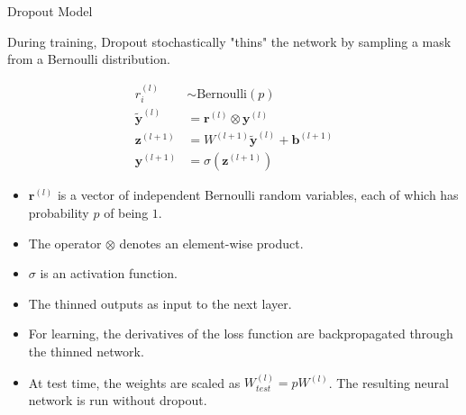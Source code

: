 \documentclass[aspectratio=169,xcolor=dvipsnames,svgnames,x11names,fleqn]{beamer}
\begin{document}
\begin{frame}{Dropout Model}

    \footnotesize

During training, Dropout stochastically "thins" the network by sampling a mask from a Bernoulli distribution.

    \begin{mybox}{}
        \begin{align*}
        r_i^{(l)} &\sim \text{Bernoulli}(p) \tag{Mask} \\
        \mathbf{\tilde{y}}^{(l)} &= \mathbf{r}^{(l)} \otimes \mathbf{y}^{(l)} \tag{Thinned Output} \\
        \mathbf{z}^{(l+1)} &= W^{(l+1)}\mathbf{\tilde{y}}^{(l)} + \mathbf{b}^{(l+1)} \\
        \mathbf{y}^{(l+1)} &= \sigma(\mathbf{z}^{(l+1)})
        \end{align*}
    \end{mybox}
\footnotesize
    \begin{itemize}
        \item $\mathbf{r}^{(l)}$ is a vector of independent Bernoulli random variables, each of which has probability $p$ of being $1$.
        \item The operator $\otimes$ denotes an element-wise product.
        \item $\sigma$ is an activation function.
        \item The thinned outputs as input to the next layer. 
        \item For learning, the derivatives of the loss function are backpropagated through the thinned network.
        \item At test time, the weights are scaled as $W^{(l)}_{test} = pW^{(l)}$. The resulting neural network is run without
dropout.
    \end{itemize}
\end{frame}
\end{document}
